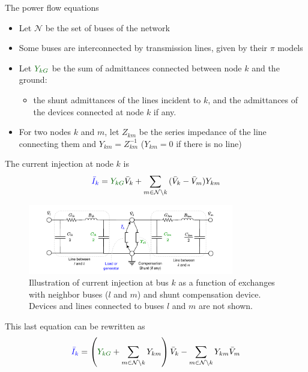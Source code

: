 \begin{frame}[allowframebreaks]{The power flow equations}
    \begin{itemize}
        \item Let $\mathcal{N}$ be the set of buses of the network
        \item Some buses are interconnected by transmission lines, given by their $\pi$ models
        \item Let $\mathcolor[RGB]{00,99,00}{Y_{kG}}$ be the sum of admittances connected between node $k$ and the ground:
        \begin{itemize}
            \item the shunt admittances of the lines incident to $k$, and the admittances of the devices connected at node $k$ if any.
        \end{itemize}
        \item For two nodes $k$ and $m$, let $Z_{km}$ be the series impedance of the line connecting them and $Y_{km} = Z_{km}^{-1}$ ($Y_{km} = 0$ if there is no line)
    \end{itemize}
    
    The current injection at node $k$ is
    \begin{equation}
        \mathcolor{blue}{\bar{I}_k} = \mathcolor[RGB]{00,99,00}{Y_{kG}} \bar{V}_k + \sum_{m \in \mathcal{N} \setminus k} {(\bar{V}_k - \bar{V}_m) Y_{km}} \label{eq:bus_inj}
    \end{equation}
   
    \begin{figure}[htbp]
        \centering
        \includegraphics[width=0.8\textwidth]{images/bus_injection_model.pdf}
        \caption{Illustration of current injection at bus $k$ as a function of exchanges with neighbor buses ($l$ and $m$) and shunt compensation device. Devices and lines connected to buses $l$ and $m$ are not shown.}
        \label{fig:bus_injection}
    \end{figure}

    This last equation can be rewritten as
    $$\mathcolor{blue}{\bar{I}_k} =  \left(\mathcolor[RGB]{00,99,00}{Y_{kG}}+ \sum_{m \in \mathcal{N} \setminus k} Y_{km} \right) \bar{V}_k  - \sum_{m \in \mathcal{N} \setminus k} Y_{km} \bar{V}_m$$
    

\end{frame}
